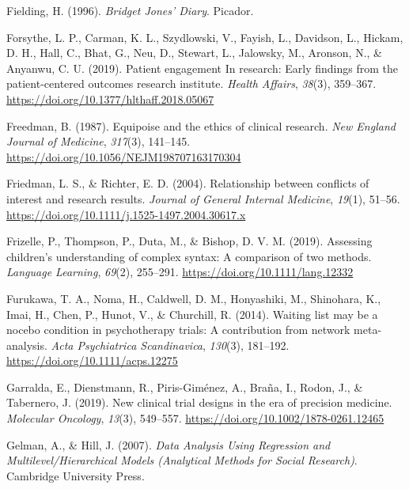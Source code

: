 \documentclass{krantz}
\newlength{\cslhangindent}
\newlength{\cslentryspacingunit} %
\newenvironment{CSLReferences}[2] %
{%
\setlength{\parindent}{0pt}
\ifodd #1
\let\oldpar\par
\def\par{\hangindent=\cslhangindent\oldpar}
\fi
\setlength{\parskip}{#2\cslentryspacingunit}
}%
{}
\begin{document}
\begin{CSLReferences}{1}{0}
\leavevmode{}%
Fielding, H. (1996). \emph{Bridget {Jones}' {Diary}}. {Picador}.

\leavevmode{}%
Forsythe, L. P., Carman, K. L., Szydlowski, V., Fayish, L., Davidson, L., Hickam, D. H., Hall, C., Bhat, G., Neu, D., Stewart, L., Jalowsky, M., Aronson, N., \& Anyanwu, C. U. (2019). Patient engagement {In} research: {Early} findings from the patient-centered outcomes research institute. \emph{Health Affairs}, \emph{38}(3), 359--367. \url{https://doi.org/10.1377/hlthaff.2018.05067}

\leavevmode{}%
Freedman, B. (1987). Equipoise and the ethics of clinical research. \emph{New England Journal of Medicine}, \emph{317}(3), 141--145. \url{https://doi.org/10.1056/NEJM198707163170304}

\leavevmode{}%
Friedman, L. S., \& Richter, E. D. (2004). Relationship between conflicts of interest and research results. \emph{Journal of General Internal Medicine}, \emph{19}(1), 51--56. \url{https://doi.org/10.1111/j.1525-1497.2004.30617.x}

\leavevmode{}%
Frizelle, P., Thompson, P., Duta, M., \& Bishop, D. V. M. (2019). Assessing children's understanding of complex syntax: A comparison of two methods. \emph{Language Learning}, \emph{69}(2), 255--291. \url{https://doi.org/10.1111/lang.12332}

\leavevmode{}%
Furukawa, T. A., Noma, H., Caldwell, D. M., Honyashiki, M., Shinohara, K., Imai, H., Chen, P., Hunot, V., \& Churchill, R. (2014). Waiting list may be a nocebo condition in psychotherapy trials: A contribution from network meta-analysis. \emph{Acta Psychiatrica Scandinavica}, \emph{130}(3), 181--192. \url{https://doi.org/10.1111/acps.12275}

\leavevmode{}%
Garralda, E., Dienstmann, R., Piris-Giménez, A., Braña, I., Rodon, J., \& Tabernero, J. (2019). New clinical trial designs in the era of precision medicine. \emph{Molecular Oncology}, \emph{13}(3), 549--557. \url{https://doi.org/10.1002/1878-0261.12465}

\leavevmode{}%
Gelman, A., \& Hill, J. (2007). \emph{Data {Analysis Using Regression} and {Multilevel}/{Hierarchical Models} ({Analytical Methods} for {Social Research})}. {Cambridge University Press}.


\end{CSLReferences}
\end{document}
